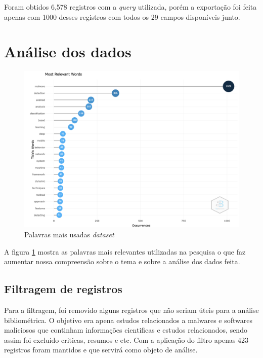 Foram obtidos 6,578 registros com a \textit{query} utilizada, porém a exportação foi feita apenas com 1000 desses registros com todos os 29 campos disponíveis junto.

\section{Análise dos dados}

\begin{figure}
    \centering
    \includegraphics[width=1\textwidth]{experiments/gsmartins96/AnaliseBibliometrica/Malware/Figs/most-relevant_words.png}
    \caption{Palavras mais usadas \textit{dataset}}
    \label{fig:MALWARES@gsmartins96:MostUsedWords}
\end{figure}

A figura \ref{fig:MALWARES@gsmartins96:MostUsedWords} mostra as palavras mais relevantes utilizadas na pesquisa o que faz aumentar nossa compreensão sobre o tema e sobre a análise dos dados feita.

\subsection{Filtragem de registros}

Para a filtragem, foi removido alguns registros que não seriam úteis para a análise bibliométrica. O objetivo era apena estudos relacionados a malwares e softwares maliciosos que continham informações cientificas e estudos relacionados, sendo assim foi excluído criticas, resumos e etc. Com a aplicação do filtro apenas 423 registros foram mantidos e que servirá como objeto de análise.

